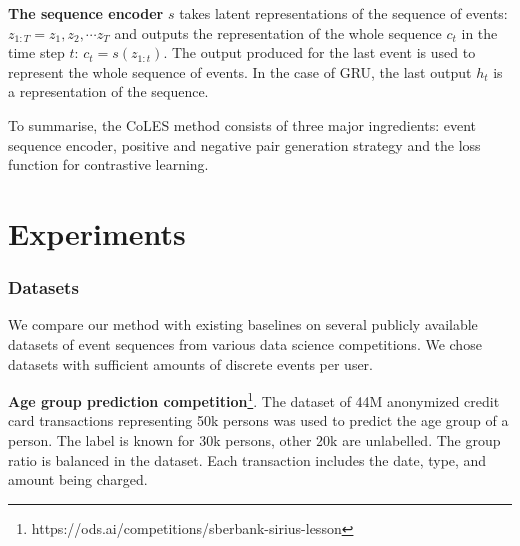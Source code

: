 \documentclass[sigconf, anonymous]{acmart}
\begin{document}
\textbf{The sequence encoder} $s$ takes latent representations of the sequence of events: $ z_{1:T} = z_1, z_2, \cdots z_T $ and outputs the representation of the whole sequence $c_t$ in the time step $t$: $c_t = s(z_{1:t})$.  The output produced for the last event is used to represent the whole sequence of events. In the case of GRU, the last output $h_t$ is a representation of the sequence.


To summarise, the CoLES method consists of three major ingredients: event sequence encoder, positive and negative pair generation strategy and the loss function for contrastive learning.


\section{Experiments} \label{sec-exp}

\subsubsection{Datasets}

We compare our method with existing baselines on several publicly available datasets of event sequences from various data science competitions. We chose datasets with sufficient amounts of discrete events per user.

\textbf{Age group prediction competition}\footnote{https://ods.ai/competitions/sberbank-sirius-lesson}. The dataset of 44M an\-onymized credit card transactions representing 50k persons was used to predict the age group of a person. The label is known for 30k persons, other 20k are unlabelled. The group ratio is balanced in the dataset. Each transaction includes the date, type, and amount being charged.

\end{document}
